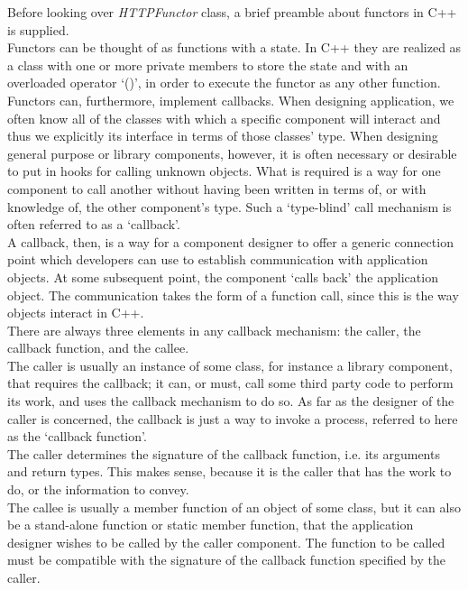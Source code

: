 Before looking over \textit{HTTPFunctor} class, a brief preamble
about functors in C++ is supplied.
\\
Functors can be thought of as functions with a state. In C++ they
are realized
as a class with one or more private members to store the state
and with an overloaded operator `()', in order to execute the
functor as any other function.
\\
Functors can, furthermore, implement callbacks.
When designing application, we often know all of the classes
with which a specific component will interact and thus we explicitly its
interface in terms of those classes' type. When designing general purpose
or library components, however, it is often necessary or desirable
to put in hooks for calling unknown objects. What is required is
a way for one component to call another without having been written
in terms of, or with knowledge of, the other component's type. Such a
`type-blind' call mechanism is often referred to as a `callback'.
\\
A callback, then, is a way for a component designer to offer a generic
connection point which developers can use to establish communication
with application objects. At some subsequent point, the component `calls
back' the application object. The communication takes the form of a
function call, since this is the way objects interact in C++.
\\
There are always three elements in any callback mechanism: the caller, the
callback function, and the callee.
\\
The caller is usually an instance of some class, for instance a library
component, that requires the callback; it can, or must, call some
third party code to perform its work, and uses the callback mechanism
to do so. As far as the designer of the caller is concerned, the callback
is just a way to invoke a process, referred to here as the
`callback function'.
\\
The caller determines the signature of the callback function, i.e. its
arguments and return types. This makes sense, because it is the caller
that has the work to do, or the information to convey.
\\
The callee is usually a member function of an object of some class, but it
can also be a stand-alone function or static member function, that the
application designer wishes to be called by the caller component.
The function to be called must be compatible with the
signature of the callback function specified by the caller.
\\

